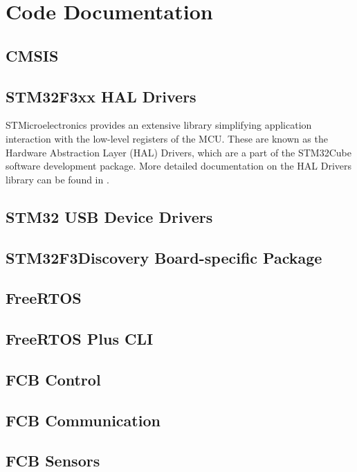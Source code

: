 \documentclass[a4paper]{report}
\begin{document}
	\section{Code Documentation}

		\subsection{CMSIS}

		\subsection{STM32F3xx HAL Drivers}
STMicroelectronics provides an extensive library simplifying application interaction with the low-level registers of the MCU. These are known as the Hardware Abstraction Layer (HAL) Drivers, which are a part of the STM32Cube software development package. More detailed documentation on the HAL Drivers library can be found in \cite{stm32f3haldrivers}.

		\subsection{STM32 USB Device Drivers}

		\subsection{STM32F3Discovery Board-specific Package}

		\subsection{FreeRTOS}

		\subsection{FreeRTOS Plus CLI}

		\subsection{FCB Control}

		\subsection{FCB Communication}

		\subsection{FCB Sensors}
\end{document}
